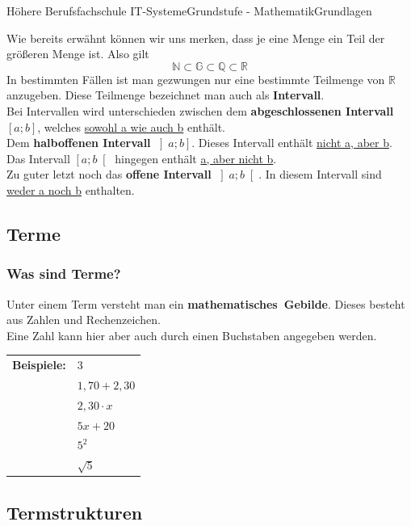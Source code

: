 \documentclass[11pt,twocolumn,oneside,openany,headings=optiontotoc,11pt,numbers=noenddot]{article}
\begin{document}
\begin{worksheet}{Höhere Berufsfachschule IT-Systeme}{Grundstufe - Mathematik}{Grundlagen}
		\par\noindent
		Wie bereits erwähnt können wir uns merken, dass je eine Menge ein Teil der größeren Menge ist. Also gilt
		\[\mathbb{N} \subset \mathbb{G} \subset \mathbb{Q} \subset \mathbb{R}\]
		In bestimmten Fällen ist man gezwungen nur eine bestimmte Teilmenge von \(\mathbb{R}\) anzugeben. Diese Teilmenge bezeichnet man auch als \textbf{Intervall}.\\
		Bei Intervallen wird unterschieden zwischen dem \textbf{abgeschlossenen Intervall} \(\left[a;b\right]\), welches \underline{sowohl a wie auch b} enthält.\\
		Dem \textbf{halboffenen Intervall} \(\left]a;b\right]\). Dieses Intervall enthält \underline{nicht a, aber b}. Das Intervall \(\left[a;b\right[\) hingegen enthält \underline{a, aber nicht b}.\\
		Zu guter letzt noch das \textbf{offene Intervall} \(\left]a;b\right[\). In diesem Intervall sind \underline{weder a noch b} enthalten.
		\subsection{Terme}
		\subsubsection*{Was sind Terme?} Unter einem Term versteht man ein \mbox{\textbf{mathematisches Gebilde}}. Dieses besteht aus Zahlen und Rechenzeichen.\\
		Eine Zahl kann hier aber auch durch einen Buchstaben angegeben werden.\\
		\par
		\begin{tabularx}{0.5\textwidth}{ll}
			\noindent
			\textbf{Beispiele:} & \(3\)\\
			& \(1,70+2,30\)\\
			& \(2,30\cdot x\)\\
			& \(5x + 20\)\\
			& \(5^2\)\\
			& \(\sqrt{5}\)\\
		\end{tabularx}
		\subsection{Termstrukturen}

\end{worksheet}
\end{document}
